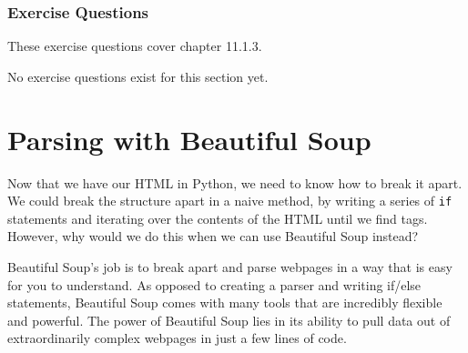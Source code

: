 \subsubsection*{Exercise Questions}
These exercise questions cover chapter 11.1.3.

No exercise questions exist for this section yet.

\section{Parsing with Beautiful Soup}
Now that we have our HTML in Python, we need to know how to break it apart. We could break the structure apart in a naive method, by writing a series of \verb|if| statements and iterating over the contents of the HTML until we find tags. However, why would we do this when we can use Beautiful Soup instead?\par
Beautiful Soup's job is to break apart and parse webpages in a way that is easy for you to understand. As opposed to creating a parser and writing if/else statements, Beautiful Soup comes with many tools that are incredibly flexible and powerful. The power of Beautiful Soup lies in its ability to pull data out of extraordinarily complex webpages in just a few lines of code.\par
